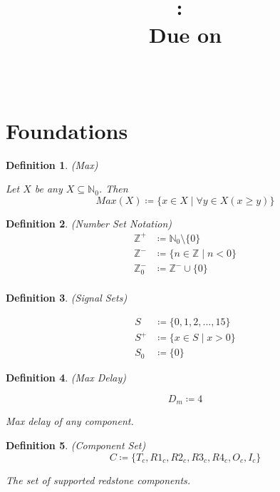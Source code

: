 \documentclass{article}
\title{
    \vspace{2in}
    \textmd{\textbf{\hmwkClass:\ \hmwkTitle}}\\
    \normalsize\vspace{0.1in}\small{Due on \hmwkDueDate}\\
    \vspace{0.1in}\large{\textit{\hmwkClassInstructor\ }}
    \vspace{3in}
}
\author{\hmwkAuthorName}
\date{}
\newtheorem{defn}{Definition}[section]
\begin{document}
\maketitle

\pagebreak

\section{Foundations}

\begin{defn} (Max)
	
	Let \(X\) be any \(X \subseteq \mathbb{N}_{0}\). Then
	\begin{equation}
		Max(X) \coloneq \{x \in X \mid \forall y \in X(x \geq y)\}
	\end{equation}
\end{defn}

\begin{defn} (Number Set Notation)
	\begin{align}
		\mathbb{Z}^+ &\coloneq \mathbb{N}_{0} \setminus \{0\} \\
		\mathbb{Z}^- &\coloneq \{n \in \mathbb{Z}\mid n < 0\} \\
		\mathbb{Z}_{0}^- &\coloneq \mathbb{Z}^- \cup \{0\} \\
	\end{align}
\end{defn}

\medskip

\begin{defn} (Signal Sets)
	
	\begin{align}
		S &\coloneq \{0, 1, 2, ..., 15\} \\
		S^+ &\coloneq \{x \in S \mid x > 0\} \\
		S_{0} &\coloneq \{0\}
	\end{align}
\end{defn}

\medskip

\begin{defn} (Max Delay)
	
	\begin{equation}
		D_{m} \coloneq 4
	\end{equation}

	Max delay of any component.
\end{defn}

\medskip

\begin{defn} (Component Set)
	\begin{equation}
		C \coloneq \{T_{c}, R1_{c}, R2_{c}, R3_{c}, R4_{c}, O_{c}, I_{c}\}
	\end{equation}

	The set of supported redstone components. 
\end{defn}
\end{document}
